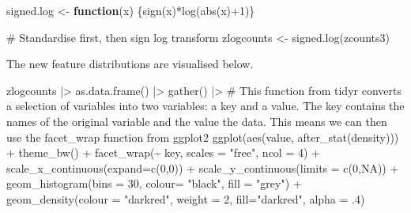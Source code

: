 \documentclass[
  letterpaper,
  DIV=11,
  numbers=noendperiod]{scrreprt}
\newenvironment{Shaded}{\begin{snugshade}}{\end{snugshade}}
\newcommand{\AttributeTok}[1]{\textcolor[rgb]{0.40,0.45,0.13}{#1}}
\newcommand{\CommentTok}[1]{\textcolor[rgb]{0.37,0.37,0.37}{#1}}
\newcommand{\ConstantTok}[1]{\textcolor[rgb]{0.56,0.35,0.01}{#1}}
\newcommand{\ControlFlowTok}[1]{\textcolor[rgb]{0.00,0.23,0.31}{\textbf{#1}}}
\newcommand{\DecValTok}[1]{\textcolor[rgb]{0.68,0.00,0.00}{#1}}
\newcommand{\FunctionTok}[1]{\textcolor[rgb]{0.28,0.35,0.67}{#1}}
\newcommand{\NormalTok}[1]{\textcolor[rgb]{0.00,0.23,0.31}{#1}}
\newcommand{\OtherTok}[1]{\textcolor[rgb]{0.00,0.23,0.31}{#1}}
\newcommand{\SpecialCharTok}[1]{\textcolor[rgb]{0.37,0.37,0.37}{#1}}
\newcommand{\StringTok}[1]{\textcolor[rgb]{0.13,0.47,0.30}{#1}}
\begin{document}
\begin{Shaded}
\begin{Highlighting}[]
\NormalTok{signed.log }\OtherTok{\textless{}{-}} \ControlFlowTok{function}\NormalTok{(x) \{}\FunctionTok{sign}\NormalTok{(x)}\SpecialCharTok{*}\FunctionTok{log}\NormalTok{(}\FunctionTok{abs}\NormalTok{(x)}\SpecialCharTok{+}\DecValTok{1}\NormalTok{)\}}

\CommentTok{\# Standardise first, then sign log transform}
\NormalTok{zlogcounts }\OtherTok{\textless{}{-}} \FunctionTok{signed.log}\NormalTok{(zcounts3) }
\end{Highlighting}
\end{Shaded}

The new feature distributions are visualised below.

\begin{Shaded}
\begin{Highlighting}[]
\NormalTok{zlogcounts }\SpecialCharTok{|\textgreater{}}
  \FunctionTok{as.data.frame}\NormalTok{() }\SpecialCharTok{|\textgreater{}} 
  \FunctionTok{gather}\NormalTok{() }\SpecialCharTok{|\textgreater{}} \CommentTok{\# This function from tidyr converts a selection of variables into two variables: a key and a value. The key contains the names of the original variable and the value the data. This means we can then use the facet\_wrap function from ggplot2}
  \FunctionTok{ggplot}\NormalTok{(}\FunctionTok{aes}\NormalTok{(value, }\FunctionTok{after\_stat}\NormalTok{(density))) }\SpecialCharTok{+}
  \FunctionTok{theme\_bw}\NormalTok{() }\SpecialCharTok{+}
  \FunctionTok{facet\_wrap}\NormalTok{(}\SpecialCharTok{\textasciitilde{}}\NormalTok{ key, }\AttributeTok{scales =} \StringTok{"free"}\NormalTok{, }\AttributeTok{ncol =} \DecValTok{4}\NormalTok{) }\SpecialCharTok{+}
  \FunctionTok{scale\_x\_continuous}\NormalTok{(}\AttributeTok{expand=}\FunctionTok{c}\NormalTok{(}\DecValTok{0}\NormalTok{,}\DecValTok{0}\NormalTok{)) }\SpecialCharTok{+}
  \FunctionTok{scale\_y\_continuous}\NormalTok{(}\AttributeTok{limits =} \FunctionTok{c}\NormalTok{(}\DecValTok{0}\NormalTok{,}\ConstantTok{NA}\NormalTok{)) }\SpecialCharTok{+}
  \FunctionTok{geom\_histogram}\NormalTok{(}\AttributeTok{bins =} \DecValTok{30}\NormalTok{, }\AttributeTok{colour=} \StringTok{"black"}\NormalTok{, }\AttributeTok{fill =} \StringTok{"grey"}\NormalTok{) }\SpecialCharTok{+}
  \FunctionTok{geom\_density}\NormalTok{(}\AttributeTok{colour =} \StringTok{"darkred"}\NormalTok{, }\AttributeTok{weight =} \DecValTok{2}\NormalTok{, }\AttributeTok{fill=}\StringTok{"darkred"}\NormalTok{, }\AttributeTok{alpha =}\NormalTok{ .}\DecValTok{4}\NormalTok{)}
\end{Highlighting}
\end{Shaded}
\end{document}
